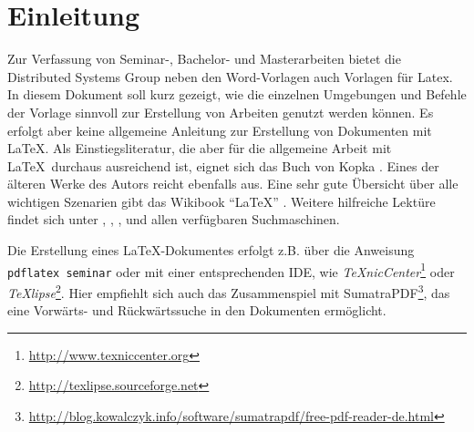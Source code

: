 %
\section{Einleitung}
%
Zur Verfassung von Seminar-, Bachelor- und Masterarbeiten bietet die Distributed Systems Group
neben den Word-Vorlagen auch Vorlagen für Latex. In diesem Dokument soll
kurz gezeigt, wie die einzelnen Umgebungen und Befehle der Vorlage sinnvoll zur Erstellung
von Arbeiten genutzt werden können. Es erfolgt aber keine allgemeine Anleitung zur
Erstellung von Dokumenten mit \LaTeX. Als Einstiegsliteratur, die aber für die allgemeine
Arbeit mit \LaTeX~durchaus ausreichend ist, eignet sich das Buch von Kopka \cite{kop02}. Eines
der älteren Werke des Autors reicht ebenfalls aus. 
Eine sehr gute Übersicht über alle wichtigen Szenarien gibt das Wikibook "`\LaTeX"' \cite{lat12}.
Weitere hilfreiche Lektüre findet sich
unter \cite{jue00}, \cite{kue11}, \cite{jue95}, \cite{erb09} und allen verfügbaren Suchmaschinen.

Die Erstellung eines \LaTeX-Dokumentes erfolgt z.B. über die Anweisung \texttt{pdflatex seminar} oder mit einer 
entsprechenden IDE, wie \textit{TeXnicCenter}\footnote{\url{http://www.texniccenter.org}} oder \textit{TeXlipse}\footnote{\url{http://texlipse.sourceforge.net}}.
Hier empfiehlt sich auch das Zusammenspiel mit SumatraPDF\footnote{\url{http://blog.kowalczyk.info/software/sumatrapdf/free-pdf-reader-de.html}}, das eine Vorwärts- und Rückwärtssuche in den Dokumenten ermöglicht. 